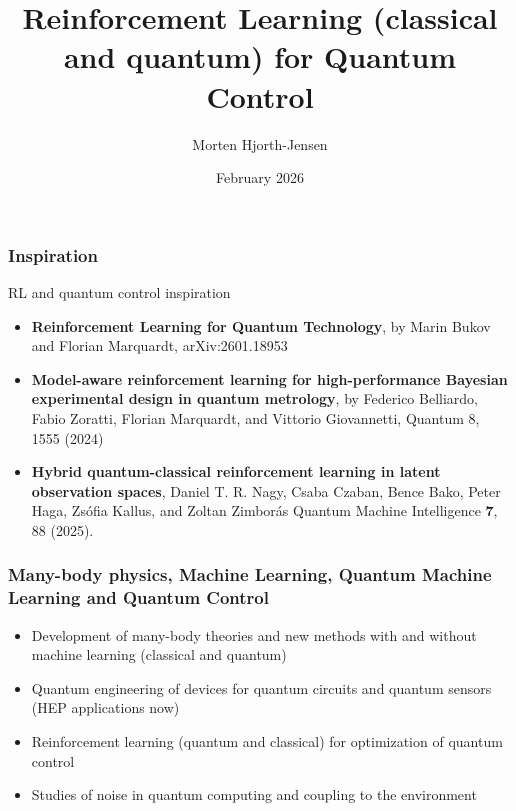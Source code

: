 \documentclass{beamer}
\begin{document}
\title{Reinforcement Learning (classical and quantum) for Quantum Control}
\author{Morten Hjorth-Jensen}
\date{February 2026}



\begin{frame}
\titlepage
\end{frame}


\begin{frame}
\frametitle{Inspiration}

\begin{alertblock}{RL and quantum control inspiration}
\begin{itemize}
\item {\bf Reinforcement Learning for Quantum Technology}, by Marin Bukov and Florian Marquardt, arXiv:2601.18953
\item {\bf Model-aware reinforcement learning for high-performance Bayesian experimental design in quantum metrology}, by Federico Belliardo, Fabio Zoratti, Florian Marquardt, and Vittorio Giovannetti, Quantum 8, 1555 (2024)
\item {\bf Hybrid quantum-classical reinforcement learning in latent observation spaces}, Daniel T. R. Nagy, Csaba Czaban, Bence Bako, Peter Haga, Zsófia Kallus, and Zoltan Zimborás  Quantum Machine Intelligence {\bf 7}, 88 (2025).
\end{itemize}
\end{alertblock}

\end{frame}

\begin{frame}
\frametitle{Many-body physics, Machine Learning, Quantum Machine Learning and Quantum Control}

\begin{block}{}
\begin{itemize}
\item Development of many-body theories and new methods with and without machine learning (classical and quantum)
\item Quantum engineering of devices for quantum circuits and quantum sensors (HEP applications now)
\item Reinforcement learning (quantum and classical) for optimization of quantum control
\item Studies of noise in quantum computing and coupling to the environment
\end{itemize}
\end{block}

\end{frame}
\end{document}
